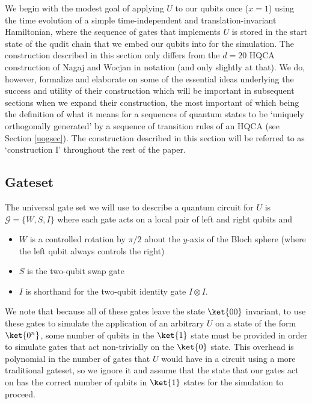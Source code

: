 \documentclass[11pt,letterpaper]{article}
\newcommand{\<}{\langle}
\renewcommand{\>}{\rangle}
\begin{document}
We begin with the modest goal of applying $U$ to our qubits once ($x=1$) using the time evolution of a simple time-independent and translation-invariant Hamiltonian, where the sequence of gates that implements $U$ is stored in the start state of the qudit chain that we embed our qubits into for the simulation. The construction described in this section only differs from the $d=20$ HQCA construction of Nagaj and Wocjan \cite{NW} in notation (and only slightly at that). We do, however, formalize and elaborate on some of the essential ideas underlying the success and utility of their construction which will be important in subsequent sections when we expand their construction, the most important of which being the definition of what it means for a sequences of quantum states to be `uniquely orthogonally generated' by a sequence of transition rules of an HQCA (see Section \ref{uogsec}). The construction described in this section will be referred to as `construction I' throughout the rest of the paper.

\subsection{Gateset}

The universal gate set we will use to describe a quantum circuit for $U$ is $\mathcal{G}=\{W,S,I\}$ where each gate acts on a local pair of left and right qubits and
\begin{itemize}
	\item $W$ is a controlled rotation by $\pi/2$ about the $y$-axis of the Bloch sphere (where the left qubit always controls the right)
	\item $S$ is the two-qubit swap gate
	\item $I$ is shorthand for the two-qubit identity gate $I\otimes I$. 
\end{itemize}
We note that because all of these gates leave the state $\ket{00}$ invariant, to use these gates to simulate the application of an arbitrary $U$ on a state of the form $\ket{0^n}$, some number of qubits in the $\ket{1}$ state must be provided in order to simulate gates that act non-trivially on the $\ket{0}$ state. This overhead is polynomial in the number of gates that $U$ would have in a circuit using a more traditional gateset, so we ignore it and assume that the state that our gates act on has the correct number of qubits in $\ket{1}$ states for the simulation to proceed.
\end{document}
